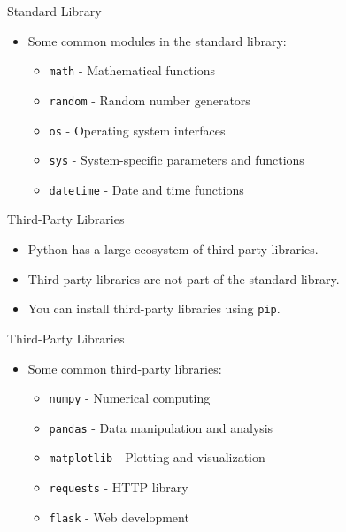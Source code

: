 \begin{frame}{Standard Library}
    \begin{itemize}
        \item Some common modules in the standard library:
        \begin{itemize}
            \item \texttt{math} - Mathematical functions
            \item \texttt{random} - Random number generators
            \item \texttt{os} - Operating system interfaces
            \item \texttt{sys} - System-specific parameters and functions
            \item \texttt{datetime} - Date and time functions
        \end{itemize}
    \end{itemize}
\end{frame}

\begin{frame}{Third-Party Libraries}
    \begin{itemize}
        \item Python has a large ecosystem of third-party libraries.
        \item Third-party libraries are not part of the standard library.
        \item You can install third-party libraries using \texttt{pip}.
    \end{itemize}
\end{frame} 

\begin{frame}{Third-Party Libraries}
    \begin{itemize}
        \item Some common third-party libraries:
        \begin{itemize}
            \item \texttt{numpy} - Numerical computing
            \item \texttt{pandas} - Data manipulation and analysis
            \item \texttt{matplotlib} - Plotting and visualization
            \item \texttt{requests} - HTTP library
            \item \texttt{flask} - Web development
        \end{itemize}
    \end{itemize}
\end{frame}

